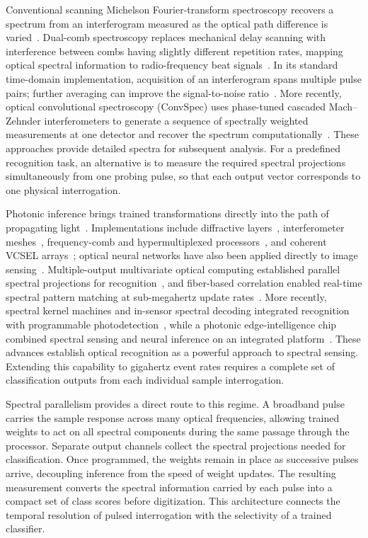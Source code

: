 \documentclass[11pt]{article}
\begin{document}
Conventional scanning Michelson Fourier-transform spectroscopy recovers a spectrum from an interferogram measured as the optical path difference is varied~\cite{yang2021}. Dual-comb spectroscopy replaces mechanical delay scanning with interference between combs having slightly different repetition rates, mapping optical spectral information to radio-frequency beat signals~\cite{picque2019,coddington2016,long2024}. In its standard time-domain implementation, acquisition of an interferogram spans multiple pulse pairs; further averaging can improve the signal-to-noise ratio~\cite{coddington2016}. More recently, optical convolutional spectroscopy (ConvSpec) uses phase-tuned cascaded Mach--Zehnder interferometers to generate a sequence of spectrally weighted measurements at one detector and recover the spectrum computationally~\cite{yao2026}. These approaches provide detailed spectra for subsequent analysis. For a predefined recognition task, an alternative is to measure the required spectral projections simultaneously from one probing pulse, so that each output vector corresponds to one physical interrogation.

Photonic inference brings trained transformations directly into the path of propagating light~\cite{wetzstein2020,bernstein2023,shastri2021}. Implementations include diffractive layers~\cite{lin2018}, interferometer meshes~\cite{shen2017}, frequency-comb and hypermultiplexed processors~\cite{xu2021,ou2024}, and coherent VCSEL arrays~\cite{chen2023vcsel}; optical neural networks have also been applied directly to image sensing~\cite{wang2023}. Multiple-output multivariate optical computing established parallel spectral projections for recognition~\cite{vornehm2014}, and fiber-based correlation enabled real-time spectral pattern matching at sub-megahertz update rates~\cite{huh2018}. More recently, spectral kernel machines and in-sensor spectral decoding integrated recognition with programmable photodetection~\cite{zhang2025kernel,wang2026}, while a photonic edge-intelligence chip combined spectral sensing and neural inference on an integrated platform~\cite{zhang2025edge}. These advances establish optical recognition as a powerful approach to spectral sensing. Extending this capability to gigahertz event rates requires a complete set of classification outputs from each individual sample interrogation.

Spectral parallelism provides a direct route to this regime. A broadband pulse carries the sample response across many optical frequencies, allowing trained weights to act on all spectral components during the same passage through the processor. Separate output channels collect the spectral projections needed for classification. Once programmed, the weights remain in place as successive pulses arrive, decoupling inference from the speed of weight updates. The resulting measurement converts the spectral information carried by each pulse into a compact set of class scores before digitization. This architecture connects the temporal resolution of pulsed interrogation with the selectivity of a trained classifier.
\end{document}
